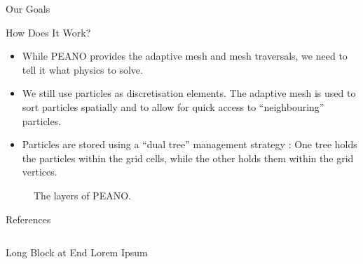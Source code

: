 \documentclass{beamer}
\begin{document}
\begin{frame}[fragile]
\begin{columns}[T]
\begin{column}{.48\textwidth}
\begin{block}{Our Goals}
\end{block}









\begin{block}{How Does It Work?}

\begin{minipage}{0.63\textwidth}


\begin{itemize}
\item While PEANO provides the adaptive mesh and mesh traversals, we need to tell it what physics
to solve.
\item We still use particles as discretisation elements. The adaptive mesh is
used to sort particles spatially and to allow for quick access to ``neighbouring'' particles.
\item Particles are stored using a ``dual tree'' management strategy
\citep{weinzierlTwoParticleingridRealisations2016}: One tree holds the particles
within the grid cells, while the other holds them within the grid vertices.
\end{itemize}
\vspace{.5em}


\end{minipage}\hfill
%
%
\begin{minipage}{0.35\textwidth}
%
\begin{figure}
\caption{The layers of PEANO.}
\label{fig:peano}
\end{figure}
%
\end{minipage}


\end{block}






\begin{block}{References}
   \renewcommand*{\bibfont}{\scriptsize}
   
\end{block}




\end{column}
\end{columns}


\begin{block}{Long Block at End}
    Lorem Ipsum
\end{block}



\end{frame}
\end{document}
